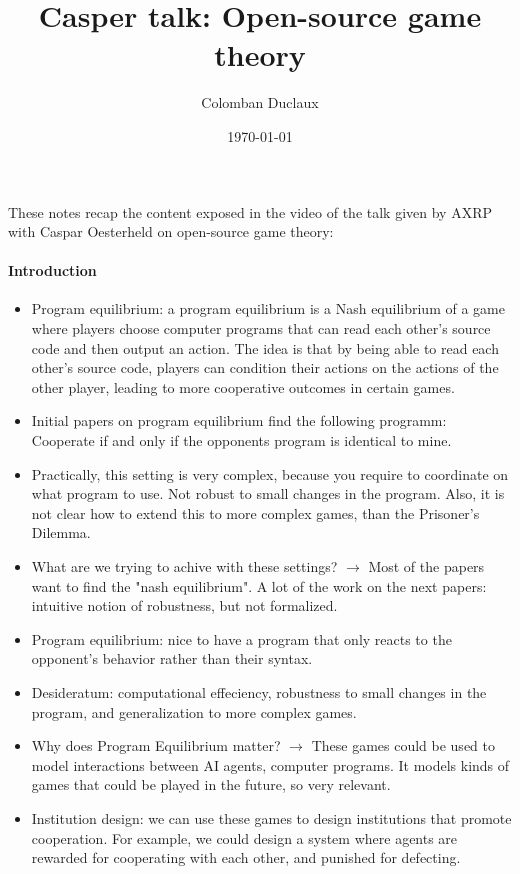 \documentclass{article}
\title{Casper talk: Open-source game theory}
\author{Colomban Duclaux}
\date{\today}
\begin{document}
\maketitle
These notes recap the content exposed in the video of the talk given by AXRP with Caspar Oesterheld on open-source game theory: \cite{caspar_oesterheld_program_equilibrium}

\paragraph{Introduction}
\begin{itemize}
    \item Program equilibrium: a program equilibrium is a Nash equilibrium of a game where players choose computer programs that can read each other's source code and then output an action. The idea is that by being able to read each other's source code, players can condition their actions on the actions of the other player, leading to more cooperative outcomes in certain games.
    \item Initial papers on program equilibrium find the following programm: Cooperate if and only if the opponents program is identical to mine.
    \item Practically, this setting is very complex, because you require to coordinate on what program to use. Not robust to small changes in the program. Also, it is not clear how to extend this to more complex games, than the Prisoner's Dilemma.
    \item What are we trying to achive with these settings? $\to$ Most of the papers want to find the "nash equilibrium". A lot of the work on the next papers: intuitive notion of robustness, but not formalized.
    \item Program equilibrium: nice to have a program that only reacts to the opponent's behavior rather than their syntax.
    \item Desideratum: computational effeciency, robustness to small changes in the program, and generalization to more complex games.
    \item Why does Program Equilibrium matter? $\to$ These games could be used to model interactions between AI agents, computer programs. It models kinds of games that could be played in the future, so very relevant.
    \item Institution design: we can use these games to design institutions that promote cooperation. For example, we could design a system where agents are rewarded for cooperating with each other, and punished for defecting.
\end{itemize}
\end{document}
